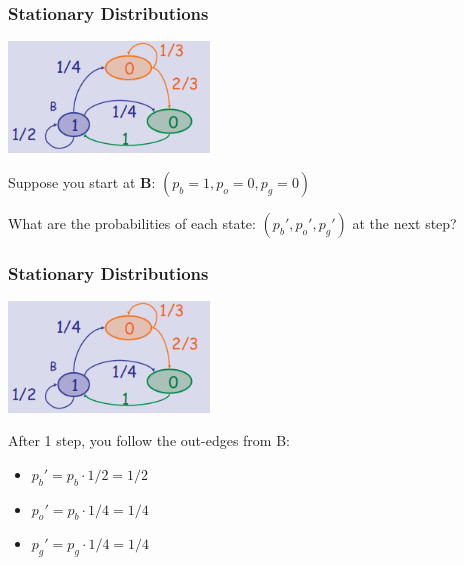 \documentclass{beamer}
\begin{document}
\begin{frame}
  \frametitle{Stationary Distributions}

  \begin{center}
    \includegraphics[width=0.4\textwidth]{../img/probgraph_walk}
  \end{center}

  \bigskip

  {\larger
  Suppose you start at {\bf B}: $(p_b = 1, p_o = 0, p_g = 0)$
  \bigskip

  What are the probabilities of each state: $(p_b', p_o', p_g')$ at
  the next step?
  }
\end{frame}

\begin{frame}
  \frametitle{Stationary Distributions}

  \begin{center}
    \includegraphics[width=0.4\textwidth]{../img/probgraph_walk}
  \end{center}

  \bigskip
  
  {\larger
    After 1 step, you follow the out-edges from B:
    \begin{itemize}
    \item $p_b' = p_b\cdot 1/2 = 1/2$
    \item $p_o' = p_b\cdot 1/4 = 1/4$
    \item $p_g' = p_g\cdot 1/4 = 1/4$
    \end{itemize}
  }
\end{frame}
\end{document}
